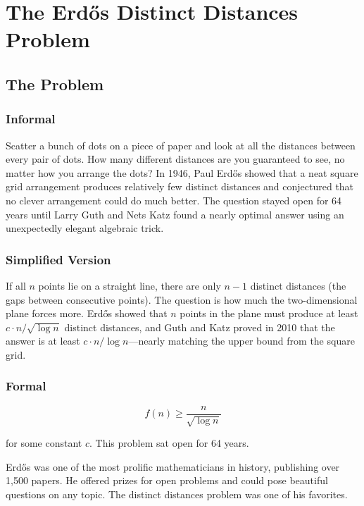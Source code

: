 \let\LocalMacro\relax

\chapter{The Erd\H{o}s Distinct Distances Problem}

\section{The Problem}

\subsection{Informal}
Scatter a bunch of dots on a piece of paper and look at all the distances between every pair of dots. How many different distances are you guaranteed to see, no matter how you arrange the dots? In 1946, Paul Erd\H{o}s showed that a neat square grid arrangement produces relatively few distinct distances and conjectured that no clever arrangement could do much better. The question stayed open for 64 years until Larry Guth and Nets Katz found a nearly optimal answer using an unexpectedly elegant algebraic trick.

\subsection{Simplified Version}
If all $n$ points lie on a straight line, there are only $n-1$ distinct distances (the gaps between consecutive points). The question is how much the two-dimensional plane forces more. Erdős showed that $n$ points in the plane must produce at least $c \cdot n/\sqrt{\log n}$ distinct distances, and Guth and Katz proved in 2010 that the answer is at least $c \cdot n/\log n$---nearly matching the upper bound from the square grid.

\subsection{Formal}
\begin{equation}
f(n) \geq \frac{n}{\sqrt{\log n}}
\end{equation}

for some constant $c$. This problem sat open for 64 years.

\begin{historicalbox}
Erd\H{o}s was one of the most prolific mathematicians in history, publishing over 1,500 papers. He offered prizes for open problems and could pose beautiful questions on any topic. The distinct distances problem was one of his favorites.
\end{historicalbox}

